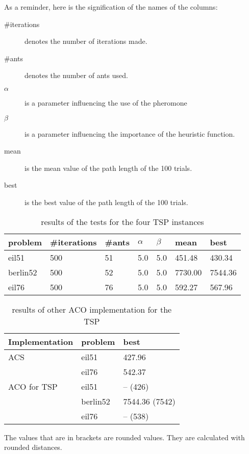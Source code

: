 As a reminder, here is the signification of the names of the columns:
\begin{description}
\item[\#iterations] denotes the number of iterations made.
\item[\#ants] denotes the number of ants used.
\item[$\alpha$] is a parameter influencing the use of the pheromone
\item[$\beta$] is a parameter influencing the importance of the heuristic function.
\item[mean] is the mean value of the path length of the 100 trials.
\item[best] is the best value of the path length of the 100 trials.
\end{description}

\begin{table}%
\centering
\small
\begin{tabular}{|l|l|l|l|l|l|l|}
\hline
problem & \#iterations & \#ants & $\alpha$ & $\beta$ & mean & best \\
\hline
\hline
eil51 & 500 & 51  & 5.0 & 5.0 & 451.48 & 430.34  \\
\hline
berlin52 & 500 & 52  & 5.0 & 5.0& 7730.00 & 7544.36\\
\hline
eil76 & 500 & 76 & 5.0 & 5.0 & 592.27 & 567.96  \\
\hline
\end{tabular}
\caption{results of the tests for the four TSP instances}
\label{tab:mytsp}
\end{table}



\begin{table}%
\centering
\begin{tabular}{|l|l|l|}
\hline
Implementation & problem & best \\
\hline
ACS \cite{dorigo1997acs} & eil51 & 427.96\\
& eil76 & 542.37 \\
ACO for TSP \cite{hlaing2011ant} & eil51 & -- (426) \\
& berlin52 & 7544.36 (7542)\\
& eil76 & -- (538) \\ 
\hline
\end{tabular}
\caption{results of other ACO implementation for the TSP}
\label{tab:acstsp}
\end{table}

The values that are in brackets are rounded values. They are calculated with rounded distances.

